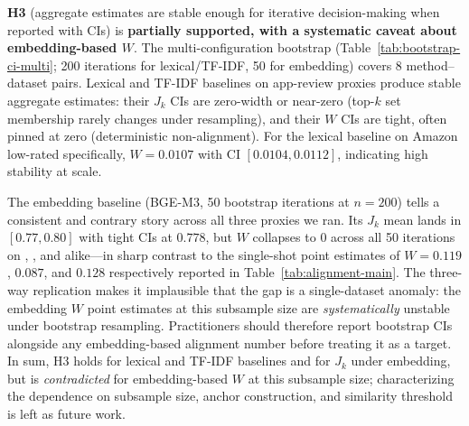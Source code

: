 \textbf{H3} (aggregate estimates are stable enough for iterative decision-making when reported with CIs) is \textbf{partially supported, with a systematic caveat about embedding-based $W$}. The multi-configuration bootstrap (Table~\ref{tab:bootstrap-ci-multi}; 200 iterations for lexical/TF-IDF, 50 for embedding) covers $8$ method--dataset pairs. Lexical and TF-IDF baselines on app-review proxies produce stable aggregate estimates: their $J_k$ CIs are zero-width or near-zero (top-$k$ set membership rarely changes under resampling), and their $W$ CIs are tight, often pinned at zero (deterministic non-alignment). For the lexical baseline on Amazon low-rated specifically, $W=0.0107$ with CI $[0.0104, 0.0112]$, indicating high stability at scale.

The embedding baseline (BGE-M3, 50 bootstrap iterations at $n=200$) tells a consistent and contrary story across all three proxies we ran. Its $J_k$ mean lands in $[0.77, 0.80]$ with tight CIs at $0.778$, but $W$ collapses to $0$ across all 50 iterations on \DatasetAmazon, \DatasetTinder, and \DatasetGojek alike---in sharp contrast to the single-shot point estimates of $W=0.119$, $0.087$, and $0.128$ respectively reported in Table~\ref{tab:alignment-main}. The three-way replication makes it implausible that the gap is a single-dataset anomaly: the embedding $W$ point estimates at this subsample size are \emph{systematically} unstable under bootstrap resampling. Practitioners should therefore report bootstrap CIs alongside any embedding-based alignment number before treating it as a target. In sum, H3 holds for lexical and TF-IDF baselines and for $J_k$ under embedding, but is \emph{contradicted} for embedding-based $W$ at this subsample size; characterizing the dependence on subsample size, anchor construction, and similarity threshold is left as future work.
